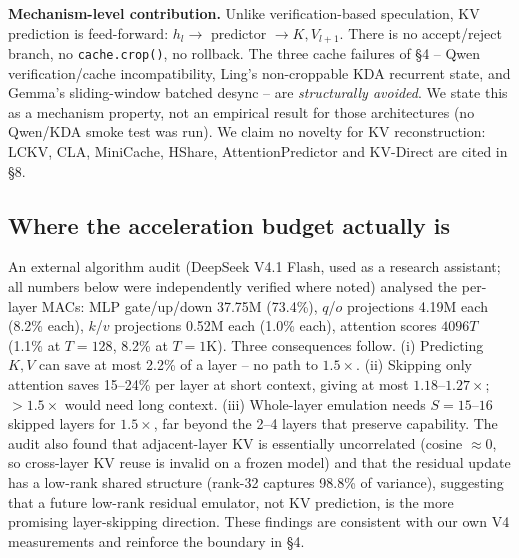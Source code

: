 \documentclass[11pt,a4paper]{article}
\begin{document}
\noindent\textbf{Mechanism-level contribution.} Unlike verification-based speculation, KV
prediction is feed-forward: $h_l \to$ predictor $\to K,V_{l+1}$. There is no accept/reject branch,
no \texttt{cache.crop()}, no rollback. The three cache failures of \S4 -- Qwen verification/cache
incompatibility, Ling's non-croppable KDA recurrent state, and Gemma's sliding-window batched
desync -- are \emph{structurally avoided}. We state this as a mechanism property, not an empirical
result for those architectures (no Qwen/KDA smoke test was run). We claim no novelty for KV
reconstruction: LCKV, CLA, MiniCache, HShare, AttentionPredictor and KV-Direct are cited in \S8.

\subsection{Where the acceleration budget actually is}
An external algorithm audit (DeepSeek V4.1 Flash, used as a research assistant; all numbers below
were independently verified where noted) analysed the per-layer MACs: MLP gate/up/down 37.75M
(73.4\%), $q$/$o$ projections 4.19M each (8.2\% each), $k$/$v$ projections 0.52M each (1.0\% each),
attention scores $4096T$ (1.1\% at $T{=}128$, 8.2\% at $T{=}1$K). Three consequences follow.
(i) Predicting $K,V$ can save at most 2.2\% of a layer -- no path to $1.5\times$. (ii) Skipping
only attention saves 15--24\% per layer at short context, giving at most $1.18$--$1.27\times$;
$>1.5\times$ would need long context. (iii) Whole-layer emulation needs $S{=}15$--$16$ skipped
layers for $1.5\times$, far beyond the 2--4 layers that preserve capability. The audit also found
that adjacent-layer KV is essentially uncorrelated (cosine $\approx 0$, so cross-layer KV reuse is
invalid on a frozen model) and that the residual update has a low-rank shared structure (rank-32
captures 98.8\% of variance), suggesting that a future low-rank residual emulator, not KV prediction,
is the more promising layer-skipping direction. These findings are consistent with our own V4
measurements and reinforce the boundary in \S4.
\end{document}
